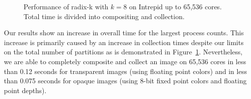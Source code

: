 \documentclass{acm_proc_article-sp}
\begin{document}
\begin{figure}[htbp]
  \centering
  \hfill
  \caption{Performance of radix-k with $k=8$ on Intrepid up to 65,536
    cores.  Total time is divided into compositing and collection.}
  \label{fig:ScalingCollect}
\end{figure}

Our results show an increase in overall time for the largest process
counts.  This increase is primarily caused by an increase in collection
times despite our limits on the total number of partitions as is
demonstrated in Figure~\ref{fig:ScalingCollect}.  Nevertheless, we are able
to completely composite and collect an image on 65,536 cores in less than
0.12 seconds for transparent images (using floating point colors) and in
less than 0.075 seconds for opaque images (using 8-bit fixed point colors
and floating point depths).
\end{document}
